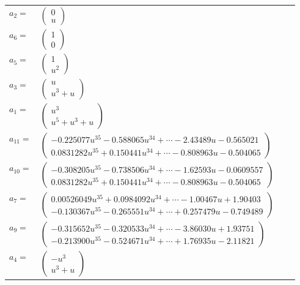 \documentclass[1p]{elsarticle_modified}
\theoremstyle{definition}
\begin{document}
\begin{tabular}{m{7pt} m{180pt} m{7pt} m{180pt} }
\flushright $a_{2}=$&$\begin{pmatrix}0\\u\end{pmatrix}$ \\
\flushright $a_{6}=$&$\begin{pmatrix}1\\0\end{pmatrix}$ \\
\flushright $a_{5}=$&$\begin{pmatrix}1\\u^2\end{pmatrix}$ \\
\flushright $a_{3}=$&$\begin{pmatrix}u\\u^3+u\end{pmatrix}$ \\
\flushright $a_{1}=$&$\begin{pmatrix}u^3\\u^5+u^3+u\end{pmatrix}$ \\
\flushright $a_{11}=$&$\begin{pmatrix}-0.225077 u^{35}-0.588065 u^{34}+\cdots-2.43489 u-0.565021\\0.0831282 u^{35}+0.150441 u^{34}+\cdots-0.808963 u-0.504065\end{pmatrix}$ \\
\flushright $a_{10}=$&$\begin{pmatrix}-0.308205 u^{35}-0.738506 u^{34}+\cdots-1.62593 u-0.0609557\\0.0831282 u^{35}+0.150441 u^{34}+\cdots-0.808963 u-0.504065\end{pmatrix}$ \\
\flushright $a_{7}=$&$\begin{pmatrix}0.00526049 u^{35}+0.0984092 u^{34}+\cdots-1.00467 u+1.90403\\-0.130367 u^{35}-0.265551 u^{34}+\cdots+0.257479 u-0.749489\end{pmatrix}$ \\
\flushright $a_{9}=$&$\begin{pmatrix}-0.315652 u^{35}-0.320533 u^{34}+\cdots-3.86030 u+1.93751\\-0.213900 u^{35}-0.524671 u^{34}+\cdots+1.76935 u-2.11821\end{pmatrix}$ \\
\flushright $a_{4}=$&$\begin{pmatrix}- u^3\\u^3+u\end{pmatrix}$ \\

\end{tabular}
\end{document}
